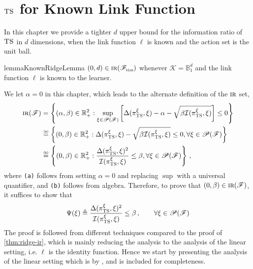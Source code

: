 \documentclass[letter, 12pt]{report}
\newcommand{\pr}{\text{\tiny\texttt{r}}}
\newcommand{\pb}{\text{\tiny\texttt{b}}}
\newcommand{\pl}{\text{\tiny\texttt{l}}}
\renewcommand{\pm}{\text{\tiny\texttt{m}}}
\newcommand{\R}{\mathbb R}
\newcommand{\explan}[1]{\stackrel{\text{\tiny \texttt{#1}}}}
\newcommand{\ball}{\mathbb{B}}
\newcommand{\cK}{\mathcal K}
\newcommand{\sF}{\mathscr F}
\newcommand{\sP}{\mathscr P}
\newcommand{\I}{\mathcal{I}}
\newcommand{\1}{\mathbf{1}}
\newcommand{\IR}{\operatorname{\textsc{ir}}}
\newcommand{\ts}{\textsc{TS}\xspace}
\theoremstyle{plain}
\theoremstyle{definition}
\theoremstyle{remark}
\begin{document}
\chapter{$\ts$ for Known Link Function}
In this chapter we provide a tighter $d$ upper bound for the
information ratio of $\ts$ in $d$ dimensions, when the link function
$\ell$ is known and the action set is the unit ball.

\begin{restatable}{lemma}{KnownRidgeLemma}\label{thm:ridge-known-ir}
    $(0, d) \in \IR(\sF_{\pb\pl\pr\pm})$ whenever $\cK = \ball_1^d$ and
    the link function $\ell$ is known to the learner.
\end{restatable}
We let $\alpha=0$ in this chapter, which leads to the alternate definition
of the $\IR$ set,
\begin{align}
    \IR(\sF)
     & = \left\{(\alpha, \beta) \in \R_+^2 : \sup_{\xi \in \sP(\sF)} \left[\Delta(\pi^\xi_\ts, \xi) - \alpha - \sqrt{\beta \I(\pi^\xi_\ts, \xi)}\right] \leq 0 \right\} \nonumber \\
     & \explan{(a)}= \left\{(0, \beta) \in \R_+^2 : \Delta(\pi^\xi_\ts, \xi) - \sqrt{\beta \I(\pi^\xi_\ts, \xi)} \leq 0, \forall \xi \in \sP(\sF) \right\}              \nonumber \\
     & \explan{(b)}= \left\{(0, \beta) \in \R_+^2 : \frac{\Delta(\pi^\xi_\ts, \xi)^2}{\I(\pi^\xi_\ts, \xi)} \leq \beta, \forall \xi \in \sP(\sF) \right\}\,, \nonumber
\end{align}
where \texttt{(a)} follows from setting $\alpha=0$ and
replacing $\sup$ with a universal quantifier,
and \texttt{(b)} follows from algebra.
Therefore, to prove that $(0, \beta) \in \IR(\sF)$, it suffices to show that
\begin{align}
    \Psi(\xi) \triangleq
    \frac{\Delta(\pi^\xi_\ts, \xi)^2}{\I(\pi^\xi_\ts, \xi)} \leq \beta\,,\qquad \forall \xi \in \sP(\sF)
    \label{eq:IR-alpha-0}
\end{align}
The proof is followed from different techniques compared to
the proof of \cref{thm:ridge-ir}, which is mainly reducing the analysis
to the analysis of the linear setting, i.e. $\ell$ is the identity function.
Hence we start by presenting the analysis of the linear setting
which is by \cite{RV16}, and is included for completeness.
\end{document}
